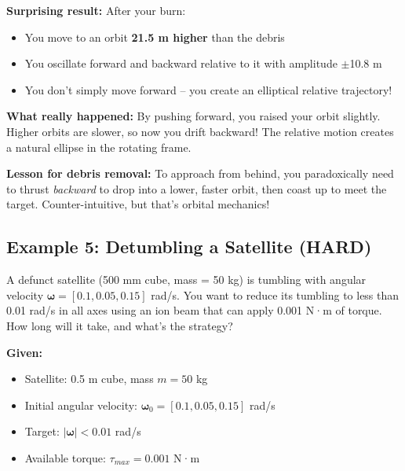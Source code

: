 \documentclass[11pt,a4paper]{article}
\begin{document}
\begin{tcolorbox}[colback=blue!5!white,colframe=blue!60!black,title=Answer]
\textbf{Surprising result:} After your burn:
\begin{itemize}[nosep]
    \item You move to an orbit \textbf{21.5 m higher} than the debris
    \item You oscillate forward and backward relative to it with amplitude $\pm$10.8 m
    \item You don't simply move forward -- you create an elliptical relative trajectory!
\end{itemize}

\textbf{What really happened:} By pushing forward, you raised your orbit slightly. Higher orbits are slower, so now you drift backward! The relative motion creates a natural ellipse in the rotating frame.

\textbf{Lesson for debris removal:} To approach from behind, you paradoxically need to thrust \textit{backward} to drop into a lower, faster orbit, then coast up to meet the target. Counter-intuitive, but that's orbital mechanics!
\end{tcolorbox}

\subsection{Example 5: Detumbling a Satellite (HARD)}

\begin{tcolorbox}[colback=green!5!white,colframe=green!60!black,title=Problem]
A defunct satellite (500 mm cube, mass = 50 kg) is tumbling with angular velocity $\boldsymbol{\omega} = [0.1, 0.05, 0.15]$ rad/s. You want to reduce its tumbling to less than 0.01 rad/s in all axes using an ion beam that can apply 0.001 N·m of torque. How long will it take, and what's the strategy?

\textbf{Given:}
\begin{itemize}[nosep]
    \item Satellite: 0.5 m cube, mass $m = 50$ kg
    \item Initial angular velocity: $\boldsymbol{\omega}_0 = [0.1, 0.05, 0.15]$ rad/s
    \item Target: $|\boldsymbol{\omega}| < 0.01$ rad/s
    \item Available torque: $\tau_{max} = 0.001$ N·m
\end{itemize}
\end{tcolorbox}
\end{document}
